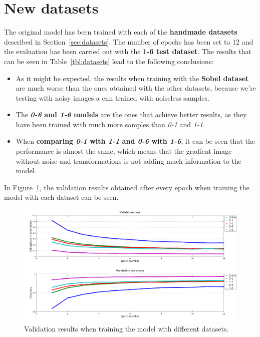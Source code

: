 \section{New datasets}\label{sec:new_datasets}
The original model has been trained with each of the \textbf{handmade datasets} described in Section~\ref{sec:datasets}. The number of epochs has been set to 12 and the evaluation has been carried out with the \textbf{1-6 test dataset}. The results that can be seen in Table~\ref{tbl:datasets} lead to the following conclusions:
\begin{itemize}
	\item As it might be expected, the results when training with the \textbf{Sobel dataset} are much worse than the ones obtained with the other datasets, because we're testing with noisy images a \gls{cnn} trained with noiseless samples.
	\item The \textbf{\textit{0-6} and \textit{1-6} models} are the ones that achieve better results, as they have been trained with much more samples than \textit{0-1} and \textit{1-1}.
	\item When \textbf{comparing \textit{0-1} with \textit{1-1} and \textit{0-6} with \textit{1-6}}, it can be seen that the performance is almost the same, which means that the gradient image without noise and transformations is not adding much information to the model.
\end{itemize}
In Figure~\ref{fig:val_datasets}, the validation results obtained after every epoch when training the model with each dataset can be seen.
\begin{figure}
	\centering
	\includegraphics[width=1\linewidth, keepaspectratio]{figures/val_datasets.png}
	\caption{Validation results when training the model with different datasets.}
	\label{fig:val_datasets}
\end{figure}

